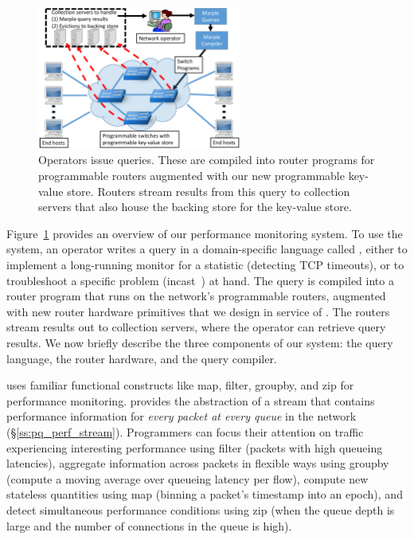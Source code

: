 \begin{figure}[!t]
\centering
\includegraphics[width=0.6\textwidth]{pq_overview.pdf}
\caption{Operators issue \TheSystem queries. These are compiled into router
programs for programmable routers augmented with our new programmable key-value
store. Routers stream results from this query to collection servers that also
house the backing store for the key-value store.}
\label{fig:overview}
\end{figure}

Figure~\ref{fig:overview} provides an overview of our performance monitoring
system. To use the system, an operator writes a query in a domain-specific
language called {\em \TheSystem,} either to implement a long-running monitor
for a statistic (\eg detecting TCP timeouts), or to troubleshoot a specific
problem (\eg incast~\cite{tcpincast}) at hand. The query is compiled into a
router program that runs on the network's programmable routers, augmented with
new router hardware primitives that we design in service of \TheSystem.  The
routers stream results out to collection servers, where the operator can
retrieve query results. We now briefly describe the three components of our
system: the query language, the router hardware, and the query compiler.

 \TheSystem uses familiar functional
constructs like {\ct map}, {\ct filter}, {\ct groupby}, and {\ct zip} for
performance monitoring.  \TheSystem provides the abstraction of a stream that
contains performance information for {\em every packet at every queue} in the
network (\S\ref{ss:pq_perf_stream}).  Programmers can focus their attention on traffic
experiencing interesting performance using {\ct filter} (\eg packets with high
queueing latencies), aggregate information across packets in flexible ways
using {\ct groupby} (\eg compute a moving average over queueing latency per
flow), compute new stateless quantities using {\ct map} (\eg binning a packet's
timestamp into an epoch), and detect simultaneous performance conditions using
{\ct zip} (\eg when the queue depth is large and the number of connections in
the queue is high).

